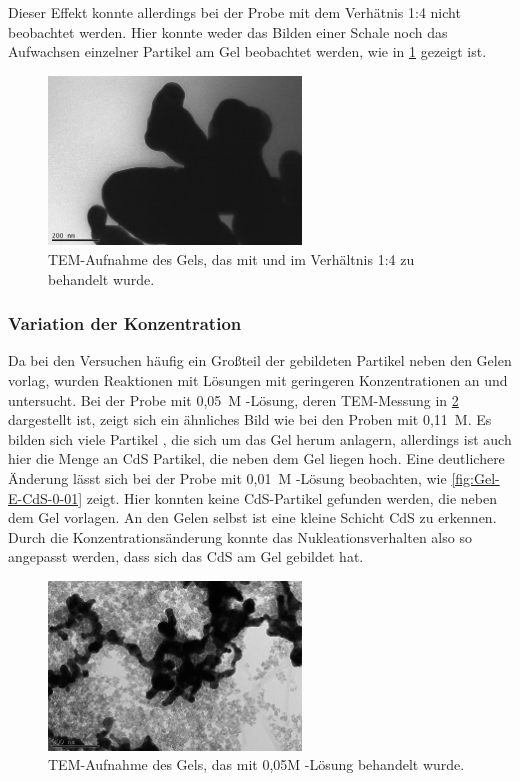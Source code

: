 		Dieser Effekt konnte allerdings bei der Probe mit dem Verhätnis 1:4 nicht beobachtet werden.
		Hier konnte weder das Bilden einer Schale noch das Aufwachsen einzelner Partikel am Gel beobachtet werden, wie in \cref{fig:Gel-E-ZnCl-1-4} gezeigt ist.
		
		\begin{figure}[H]
			\centering
			\includegraphics[width=0.6\textwidth]{Bilder/Gel-E-ZnCl-1-4} 	
			\caption{TEM-Aufnahme des Gels, das mit  und  im Verhältnis 1:4  zu  behandelt wurde.}
			\label{fig:Gel-E-ZnCl-1-4}
		\end{figure}
	
		\subsubsection{Variation der Konzentration}
		Da bei den Versuchen häufig ein Großteil der gebildeten Partikel neben den Gelen vorlag, wurden Reaktionen mit Lösungen mit geringeren Konzentrationen an  und  untersucht.
		Bei der Probe mit 0,05~M -Lösung, deren TEM-Messung in \cref{fig:Gel-E-CdS-0-05} dargestellt ist,  zeigt sich ein ähnliches Bild wie bei den Proben mit 0,11~M.
		Es bilden sich viele Partikel , die sich um das Gel herum anlagern, allerdings ist auch hier die Menge an CdS Partikel, die neben dem Gel liegen hoch.
		Eine deutlichere Änderung lässt sich bei der Probe mit 0,01~M -Lösung beobachten, wie \cref{fig:Gel-E-CdS-0-01} zeigt.
		Hier konnten keine CdS-Partikel gefunden werden, die neben dem Gel vorlagen.
		An den Gelen selbst ist eine kleine Schicht CdS zu erkennen.
		Durch die Konzentrationsänderung konnte das Nukleationsverhalten also so angepasst werden, dass sich das CdS am Gel gebildet hat.
		
		\begin{figure}[H]
			\centering
			\includegraphics[width=0.6\textwidth]{Bilder/Gel-E-CdS-0,05} 	
			\caption{TEM-Aufnahme des Gels, das mit 0,05M -Lösung behandelt wurde.}
			\label{fig:Gel-E-CdS-0-05}
		\end{figure}
	
